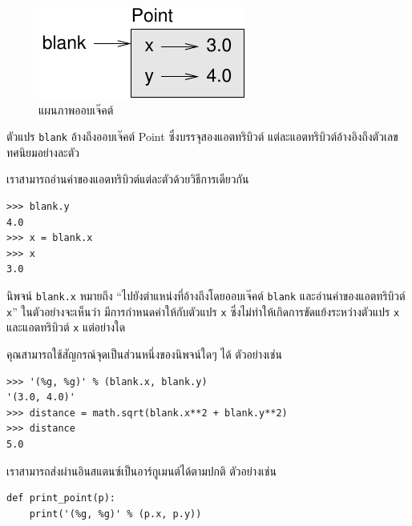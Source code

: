 \begin{figure}
\centerline
{\includegraphics[scale=0.8]{figs/point.pdf}}
\caption{แผนภาพออบเจ๊คต์}
\label{fig.point}
\end{figure}


ตัวแปร {\tt blank} อ้างถึงออบเจ๊คต์ Point ซึ่งบรรจุสองแอตทริบิวต์ แต่ละแอตทริบิวต์อ้างอิงถึงตัวเลขทศนิยมอย่างละตัว

เราสามารถอ่านค่าของแอตทริบิวต์แต่ละตัวด้วยวิธีการเดียวกัน

\begin{verbatim}
>>> blank.y
4.0
>>> x = blank.x
>>> x
3.0
\end{verbatim}
%

นิพจน์ {\tt blank.x} หมายถึง ``ไปยังตำแหน่งที่อ้างถึงโดยออบเจ๊คต์ {\tt blank} และอ่านค่าของแอตทริบิวต์ {\tt x}'' 
ในตัวอย่างจะเห็นว่า มีการกำหนดค่าให้กับตัวแปร {\tt x} ซึ่งไม่ทำให้เกิดการขัดแย้งระหว่างตัวแปร {\tt x} และแอตทริบิวต์ {\tt x} แต่อย่างใด

คุณสามารถใช้สัญกรณ์จุดเป็นส่วนหนึ่งของนิพจน์ใดๆ ได้ ตัวอย่างเช่น

\begin{verbatim}
>>> '(%g, %g)' % (blank.x, blank.y)
'(3.0, 4.0)'
>>> distance = math.sqrt(blank.x**2 + blank.y**2)
>>> distance
5.0
\end{verbatim}
%
เราสามารถส่งผ่านอินสแตนซ์เป็นอาร์กูเมนต์ได้ตามปกติ ตัวอย่างเช่น

\begin{verbatim}
def print_point(p):
    print('(%g, %g)' % (p.x, p.y))
\end{verbatim}
%

